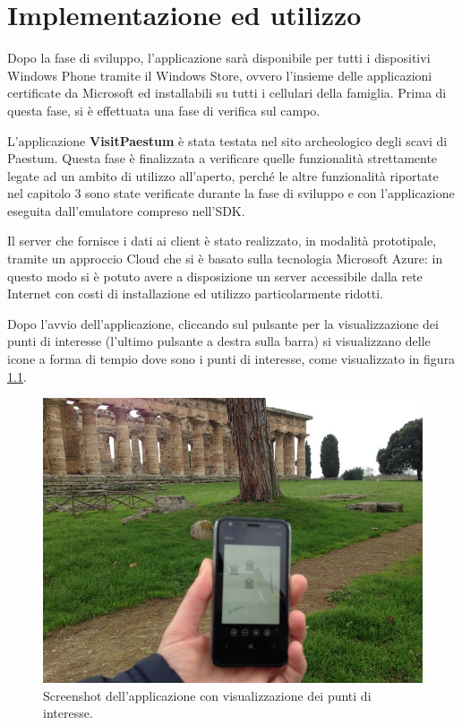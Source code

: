 
\chapter{Implementazione ed utilizzo}
\label{ref:test}

Dopo la fase di sviluppo, l'applicazione sarà disponibile per tutti i dispositivi Windows Phone tramite il Windows Store, ovvero l'insieme delle applicazioni certificate da Microsoft ed installabili su tutti i cellulari della famiglia.
Prima di questa fase, si è effettuata una fase di verifica sul campo.

L'applicazione \textbf{VisitPaestum} è stata testata nel sito archeologico degli scavi di Paestum.
Questa fase è finalizzata a verificare quelle funzionalità strettamente legate ad un ambito di utilizzo all'aperto, perché le altre funzionalità riportate nel capitolo 3 sono state verificate durante la fase di sviluppo e con l'applicazione eseguita dall'emulatore compreso nell'SDK.

Il server che fornisce i dati ai client è stato realizzato, in modalità prototipale, tramite un approccio Cloud che si è basato sulla tecnologia Microsoft Azure: in questo modo si è potuto avere a disposizione un server accessibile dalla rete Internet con costi di installazione ed utilizzo particolarmente ridotti.

Dopo l'avvio dell'applicazione, cliccando sul pulsante per la visualizzazione dei punti di interesse (l'ultimo pulsante a destra sulla barra) si visualizzano delle icone a forma di tempio dove sono i punti di interesse, come visualizzato in figura \ref{visualizzazionepuntidiinteresse}.
\begin{figure}[h!]
\begin{center}
\includegraphics[scale=0.4]{imgs/immaginiapp/visualizzazionepuntidiinteresse.jpg} 
\caption{Screenshot dell'applicazione con visualizzazione dei punti di interesse.\label{visualizzazionepuntidiinteresse}}
\end{center}
\end{figure}

